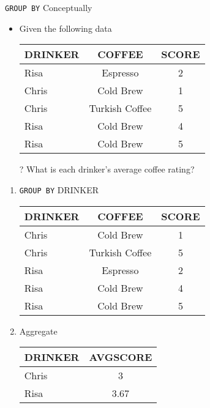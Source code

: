 \documentclass[aspectratio=169]{beamer}
\begin{document}
\begin{frame}{\texttt{GROUP BY} Conceptually}
\footnotesize{
\begin{itemize}
\item Given the following data
\begin{tabular}{|l|c|c| }  \hline
\textrm{DRINKER} & \textrm{COFFEE} & \textrm{SCORE}\\ \hline
Risa & Espresso & 2\\ \hline
Chris & Cold Brew & 1\\ \hline
Chris & Turkish Coffee & 5 \\ \hline
Risa & Cold Brew & 4 \\ \hline
Risa & Cold Brew & 5 \\ \hline
\end{tabular}
\item[?] What is each drinker's average coffee rating?
\end{itemize}
\begin{enumerate}
\item \texttt{GROUP BY} DRINKER
\begin{tabular}{|l|c|c| }  \hline
\textrm{DRINKER} & \textrm{COFFEE} & \textrm{SCORE}\\ \hline
Chris & Cold Brew & 1\\ \hline
Chris & Turkish Coffee & 5 \\ \hline \hline
Risa & Espresso & 2\\ \hline
Risa & Cold Brew & 4 \\ \hline
Risa & Cold Brew & 5 \\ \hline
\end{tabular}
\item Aggregate
\begin{tabular}{|l|c| }  \hline
\textrm{DRINKER} & \textrm{AVGSCORE}\\ \hline
Chris & 3\\ \hline
Risa & 3.67 \\ \hline
\end{tabular}
\end{enumerate}
}
\end{frame}
\end{document}
